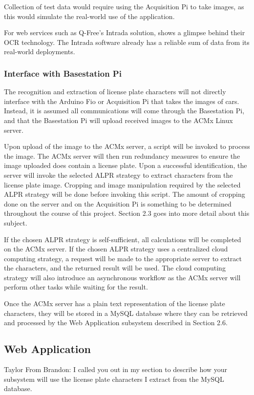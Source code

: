 \documentclass[11pt, oneside, fullpage, doublespace]{article}
\begin{document}
Collection of test data would require using the Acquisition Pi to take images, as this would simulate the real-world use of the application.

For web services such as Q-Free's Intrada solution, \cite{intrada2014} shows a glimpse behind their OCR technology. The Intrada software already has a reliable sum of data from its real-world deployments.

\subsubsection{Interface with Basestation Pi}
The recognition and extraction of license plate characters will not directly interface with the Arduino Fio or Acquisition Pi that takes the images of cars. Instead, it is assumed all communications will come through the Basestation Pi, and that the Basestation Pi will upload received images to the ACMx Linux server.

Upon upload of the image to the ACMx server, a script will be invoked to process the image. The ACMx server will then run redundancy measures to ensure the image uploaded does contain a license plate. Upon a successful identification, the server will invoke the selected ALPR strategy to extract characters from the license plate image. Cropping and image manipulation required by the selected ALPR strategy will be done before invoking this script. The amount of cropping done on the server and on the Acquisition Pi is something to be determined throughout the course of this project. Section 2.3 goes into more detail about this subject.

If the chosen ALPR strategy is self-sufficient, all calculations will be completed on the ACMx server. If the chosen ALPR strategy uses a centralized cloud computing strategy, a request will be made to the appropriate server to extract the characters, and the returned result will be used. The cloud computing strategy will also introduce an asynchronous workflow as the ACMx server will perform other tasks while waiting for the result.

Once the ACMx server has a plain text representation of the license plate characters, they will be stored in a MySQL database where they can be retrieved and processed by the Web Application subsystem described in Section 2.6.


\subsection{Web Application}
Taylor
From Brandon: I called you out in my section to describe how your subsystem will use the license plate characters I extract from the MySQL database.
\end{document}
